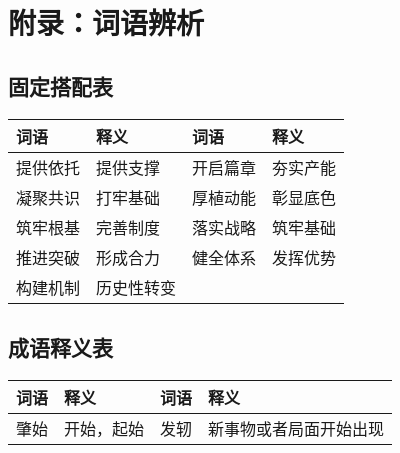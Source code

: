\section{附录：词语辨析}
\label{sec:appendix}

\subsection{固定搭配表}

\begin{longtable}{|p{}|p{}|p{}|p{}|}
    \hline
    \textbf{词语} & \textbf{释义} & \textbf
    {词语}        & \textbf{释义}                  \\
    \hline
    提供依托        & 提供支撑        & 开启篇章    & 夯实产能 \\
    \hline
    凝聚共识        & 打牢基础        & 厚植动能    & 彰显底色 \\
    \hline
    筑牢根基        & 完善制度        & 落实战略    & 筑牢基础 \\
    \hline
    推进突破        & 形成合力        & 健全体系    & 发挥优势 \\
    \hline
    构建机制        & 历史性转变 &                              \\
    \hline
\end{longtable}

\subsection{成语释义表}

\begin{longtable}{|p{}|p{}|p{}|p{}|}
    \hline
    \textbf{词语} & \textbf{释义} & \textbf
    {词语}        & \textbf{释义}                         \\
    \hline
    肇始          & 开始，起始       & 发轫      & 新事物或者局面开始出现 \\

    \hline
\end{longtable}